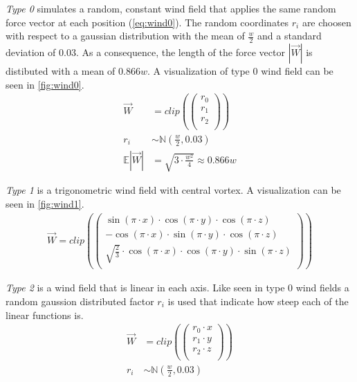 \newline
\emph{Type 0} simulates a random, constant wind field that applies the same random force vector at each position (\cref{eq:wind0}). The random coordinates $r_i$ are choosen with respect to a gaussian distribution with the mean of $\frac{w}{2}$ and a standard deviation of $0.03$. As a consequence, the length of the force vector $|\overrightarrow{W}|$ is distibuted with a mean of $0.866w$. A visualization of type 0 wind field can be seen in \cref{fig:wind0}.
\begin{align} \label{eq:wind0}
	\overrightarrow{W} &= clip(\left(
	\begin{array}{c}
		r_0\\
		r_1\\
		r_2\\
	\end{array}
	\right))\\
	r_i &\sim \mathbb{N}(\frac{w}{2}, 0.03)\\
	\mathbb{E}|\overrightarrow{W}| &= \sqrt{3 \cdot \frac{w^2}{4}} \approx 0.866 w
\end{align}

\newpage

\emph{Type 1} is a trigonometric wind field with central vortex. A visualization can be seen in \cref{fig:wind1}.
\begin{align} \label{eq:wind1}
	\overrightarrow{W} = clip(\left(
	\begin{array}{c}
		\sin(\pi \cdot x) \cdot \cos(\pi \cdot y) \cdot \cos(\pi \cdot z)\\
		- \cos(\pi \cdot x) \cdot \sin(\pi \cdot y) \cdot \cos(\pi \cdot z)\\
		\sqrt{\frac{2}{3}} \cdot \cos(\pi \cdot x) \cdot \cos(
		\pi \cdot y) \cdot \sin(\pi \cdot z)\\
	\end{array}
	\right))
\end{align}
\newline

\emph{Type 2} is a wind field that is linear in each axis. Like seen in type 0 wind fields a random gaussion distributed factor $r_i$ is used that indicate how steep each of the linear functions is.
\begin{align}
	\overrightarrow{W} &= clip(\left(
	\begin{array}{c}
		r_0 \cdot x\\
		r_1 \cdot y\\
		r_2 \cdot z\\
	\end{array}
	\right))\\
	r_i &\sim \mathbb{N}(\frac{w}{2}, 0.03)
\end{align}
\newline

